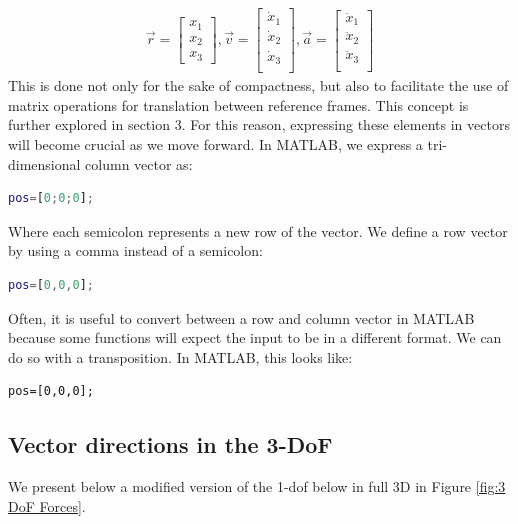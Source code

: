 \documentclass[12pt]{report}
\begin{document}
\begin{gather}
    \vec{r}=\begin{bmatrix}
        x_1\\
        x_2\\
        x_3
    \end{bmatrix},
    \vec{v}=\begin{bmatrix}
        \dot{x}_1\\
        \dot{x}_2\\
        \dot{x}_3\\
    \end{bmatrix},
        \vec{a}=\begin{bmatrix}
        \ddot{x}_1\\
        \ddot{x}_2\\
        \ddot{x}_3\\
    \end{bmatrix}
\end{gather}
This is done not only for the sake of compactness, but also to facilitate the use of matrix operations for translation between reference frames. This concept is further explored in section 3. For this reason, expressing these elements in vectors will become crucial as we move forward. In MATLAB, we express a tri-dimensional column vector as:
\begin{lstlisting}[language=Matlab]
pos=[0;0;0];
\end{lstlisting}
Where each semicolon represents a new row of the vector. We define a row vector by using a comma instead of a semicolon: 
\begin{lstlisting}[language=Matlab]
pos=[0,0,0];
\end{lstlisting}
Often, it is useful to convert between a row and column vector in MATLAB because some functions will expect the input to be in a different format. We can do so with a transposition. In MATLAB, this looks like: 
\begin{lstlisting}
pos=[0,0,0];
\end{lstlisting}
\subsection{Vector directions in the 3-DoF}\label{sec: vector directions in the 3DoF}
We present below a modified version of the 1-\gls{dof} below in full 3D in Figure \ref{fig:3 DoF Forces}.

\end{document}
